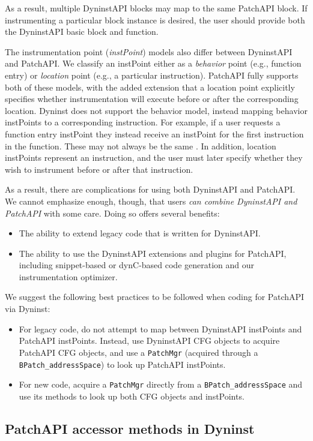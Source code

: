 As a result, multiple DyninstAPI blocks may map to the same PatchAPI
block. If instrumenting a particular block instance is desired, the
user should provide both the DyninstAPI basic block and function. 

The instrumentation point (\emph{instPoint}) models also differ
between DyninstAPI and PatchAPI. We classify an instPoint either as
a \emph{behavior} point (e.g., function entry) or \emph{location}
point (e.g., a particular instruction). PatchAPI fully supports both
of these models, with the added extension that a location point
explicitly specifies whether instrumentation will execute before or
after the corresponding location. Dyninst does not support the
behavior model, instead mapping behavior instPoints to a corresponding
instruction. For example, if a user requests a function entry
instPoint they instead receive an instPoint for the first instruction
in the function. These may not always be the
same \cite{Bernat-AWAT}. In addition, location instPoints represent an
instruction, and the user must later specify whether they wish to
instrument before or after that instruction.

As a result, there are complications for using both DyninstAPI and
PatchAPI. We cannot emphasize enough, though, that users \emph{can
combine DyninstAPI and PatchAPI} with some care. Doing so offers
several benefits:
\begin{itemize}
\item The ability to extend legacy code that is written for
DyninstAPI. 
\item The ability to use the DyninstAPI extensions and plugins for
PatchAPI, including snippet-based or dynC-based code generation and
our instrumentation optimizer. 
\end{itemize}
We suggest the following best practices to be followed when coding for
PatchAPI via Dyninst:
\begin{itemize}
\item For legacy code, do not attempt to map between DyninstAPI
instPoints and PatchAPI instPoints. Instead, use DyninstAPI CFG
objects to acquire PatchAPI CFG objects, and use a \texttt{PatchMgr} (acquired
through a \texttt{BPatch\_addressSpace}) to look up
PatchAPI instPoints. 
\item For new code, acquire a \texttt{PatchMgr} directly from
a \texttt{BPatch\_addressSpace} and use its methods to look up both
CFG objects and instPoints. 
\end{itemize}

\subsection{PatchAPI accessor methods in Dyninst}


